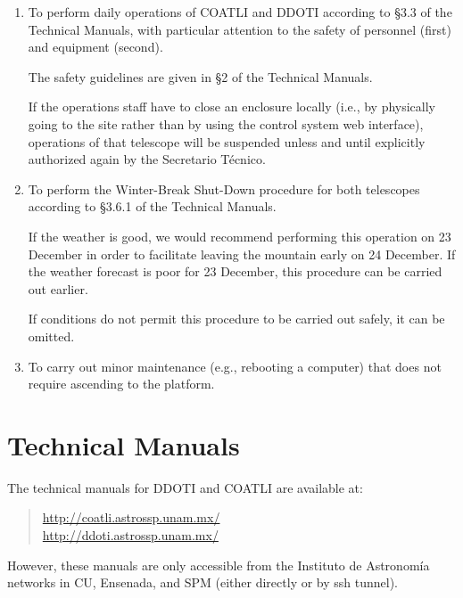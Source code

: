 \documentclass{article}
\begin{document}
\begin{enumerate}

\item
To perform daily operations of COATLI and DDOTI according to \S3.3 of the Technical Manuals, with particular attention to the safety of personnel (first) and equipment (second). 

The safety guidelines are given in \S2 of the Technical Manuals.

If the operations staff have to close an enclosure locally (i.e., by physically going to the site rather than by using the control system web interface), operations of that telescope will be suspended unless and until explicitly authorized again by the Secretario Técnico.
\item
To perform the Winter-Break Shut-Down procedure for both telescopes according to \S3.6.1 of the Technical Manuals. 

If the weather is good, we would recommend performing this operation on 23 December in order to facilitate leaving the mountain early on 24 December. If the weather forecast is poor for 23 December, this procedure can be carried out earlier.

If conditions do not permit this procedure to be carried out safely, it can be omitted.
\item
To carry out minor maintenance (e.g., rebooting a computer) that does not require ascending to the platform.
\end{enumerate}

\section{Technical Manuals}

The technical manuals for DDOTI and COATLI are available at:

\begin{quote}
\url{http://coatli.astrossp.unam.mx/}\\
\url{http://ddoti.astrossp.unam.mx/}
\end{quote}

However, these manuals are only accessible from the Instituto de Astronomía networks in CU, Ensenada, and SPM (either directly or by ssh tunnel).
\end{document}

